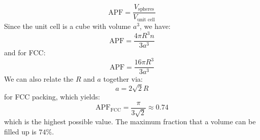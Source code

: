 \begin{itemize}
    \begin{equation}
        \text{APF} = \frac{V_\text{spheres}}{V_\text{unit cell}}
    \end{equation}
    Since the unit cell is a cube with volume $a^3$, we have:
    \begin{equation}
        \text{APF} = \frac{4\pi R^3 n}{3a^3}
    \end{equation}
    and for FCC:
    \begin{equation}
        \text{APF} = \frac{16\pi R^3}{3a^3}
    \end{equation}
    We can also relate the $R$ and $a$ together via:
    \begin{equation}
        a = 2\sqrt{2}R
    \end{equation}
    for FCC packing, which yields:
    \begin{equation}
        \text{APF}_\text{FCC} = \frac{\pi}{3\sqrt{2}} \approx 0.74
    \end{equation}
    which is the highest possible value. The maximum fraction that a volume can be filled up is $74\%$.
\end{itemize}